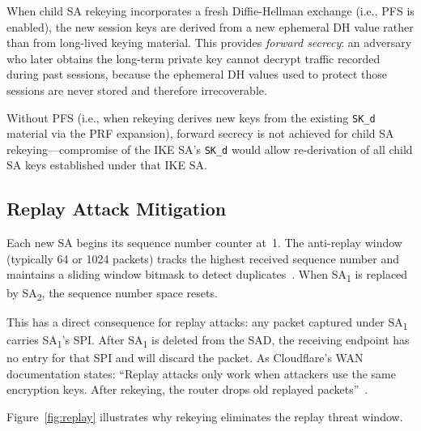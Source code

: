 \documentclass[sigconf,nonacm]{acmart}
\begin{document}
When child SA rekeying incorporates a fresh Diffie-Hellman exchange (i.e., PFS is
enabled), the new session keys are derived from a new ephemeral DH value rather than
from long-lived keying material. This provides \emph{forward secrecy}: an adversary
who later obtains the long-term private key cannot decrypt traffic recorded during
past sessions, because the ephemeral DH values used to protect those sessions are
never stored and therefore irrecoverable.

Without PFS (i.e., when rekeying derives new keys from the existing \texttt{SK\_d}
material via the PRF expansion), forward secrecy is not achieved for child SA
rekeying---compromise of the IKE SA's \texttt{SK\_d} would allow re-derivation of
all child SA keys established under that IKE SA.

\subsection{Replay Attack Mitigation}

Each new SA begins its sequence number counter at~1. The anti-replay window (typically
64 or 1024 packets) tracks the highest received sequence number and maintains a
sliding window bitmask to detect duplicates~\cite{rfc4302}. When SA\textsubscript{1}
is replaced by SA\textsubscript{2}, the sequence number space resets.

This has a direct consequence for replay attacks: any packet captured under
SA\textsubscript{1} carries SA\textsubscript{1}'s SPI. After SA\textsubscript{1} is
deleted from the SAD, the receiving endpoint has no entry for that SPI and will discard
the packet. As Cloudflare's WAN documentation states: ``Replay attacks only work when
attackers use the same encryption keys. After rekeying, the router drops old replayed
packets''~\cite{cloudflare}.

Figure~\ref{fig:replay} illustrates why rekeying eliminates the replay threat window.
\end{document}
